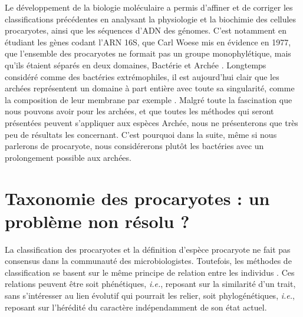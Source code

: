 Le développement de la biologie moléculaire a permis d'affiner et de corriger les classifications précédentes en analysant la physiologie et la biochimie des cellules procaryotes, ainsi que les séquences d'ADN des génomes. C'est notamment en étudiant les gènes codant l'ARN 16S, que Carl Woese mis en évidence en 1977, que l'ensemble des procaryotes ne formait pas un groupe monophylétique, mais qu'ils étaient séparés en deux domaines, Bactérie et Archée \cite{woese_phylogenetic_1977}. Longtemps considéré comme des bactéries extrémophiles, il est aujourd'hui clair que les archées représentent un domaine à part entière avec toute sa singularité, comme la composition de leur membrane par exemple \cite{albers_archaeal_2011}. Malgré toute la fascination que nous pouvons avoir pour les archées, et que toutes les méthodes qui seront présentées peuvent s'appliquer aux espèces Archée, nous ne présenterons que très peu de résultats les concernant. C'est pourquoi dans la suite, même si nous parlerons de procaryote, nous considérerons plutôt les bactéries avec un prolongement possible aux archées.

\section{Taxonomie des procaryotes : un problème non résolu ?}

La classification des procaryotes et la définition d'espèce procaryote ne fait pas consensus dans la communauté des microbiologistes. Toutefois, les méthodes de classification se basent sur le même principe de relation entre les individus \cite{aldhebiani_species_2018}. Ces relations peuvent être soit phénétiques, \textit{i.e.}, reposant sur la similarité d'un trait, sans s'intéresser au lien évolutif qui pourrait les relier, soit phylogénétiques, \textit{i.e.}, reposant sur l'hérédité du caractère indépendamment de son état actuel.

